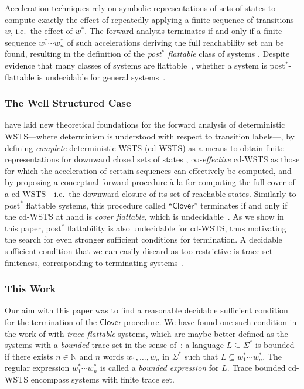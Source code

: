 \documentclass[11pt,reqno,a4paper]{amsart}
\theoremstyle{plain}
\theoremstyle{definition}
\theoremstyle{remark}
\renewcommand{\paragraph}{\subsubsection*}
\begin{document}
Acceleration techniques rely on symbolic representations of sets of
states to compute exactly the effect of repeatedly applying a finite
sequence of transitions $w$, i.e.\ the effect of $w^\ast$.  The forward
analysis terminates if and only if a finite sequence $w_1^\ast\cdots
w_n^\ast$ of such accelerations deriving the full reachability set can
be found, resulting in the definition of the \emph{post$^\ast$
  flattable} class of systems \citep{flataccel}.  Despite evidence
that many classes of systems are
flattable~\citep{flat2dim,flatevery,BFGHM-lics15},
whether a system is post$^\ast$-flattable is undecidable for general
systems~\citep{flataccel}.
 
\paragraph{The Well Structured Case}
 have laid new theoretical foundations for the
forward analysis of deterministic WSTS---where determinism is
understood with respect to transition labels---, by defining
\emph{complete} deterministic WSTS (cd-WSTS) as a means to obtain
finite representations for downward closed sets of states \citep[see
also][]{wadl}, \emph{$\infty$-effective} cd-WSTS as those for which
the acceleration of certain sequences can effectively be computed, and
by proposing a conceptual forward procedure \`a la
\citet{kmtree} for computing the full cover of a
cd-WSTS---i.e.\ the downward closure of its set of reachable states.
Similarly to post$^\ast$ flattable systems, this procedure called
``$\mathsf{Clover}$'' terminates if and only if the cd-WSTS at hand is
\emph{cover flattable}, which is undecidable~\citep{cwsts2}.  As we
show in this paper, post$^\ast$ flattability is also undecidable for
cd-WSTS, thus motivating the search for even stronger sufficient
conditions for termination.  A decidable sufficient condition that we
can easily discard as too restrictive is trace set finiteness,
corresponding to terminating systems~\citep{origwsts}.

\paragraph{This Work}
Our aim with this paper was to find a reasonable decidable sufficient
condition for the termination of the $\mathsf{Clover}$ procedure.  We
have found one such condition in the work of \citet*{foctlpr} with
\emph{trace flattable} systems, which are maybe better defined as the
systems with a \emph{bounded} trace set in the sense of~\citet{bcfl}:
a language $L\subseteq\Sigma^\ast$ is bounded if there exists
$n\in\mathbb{N}$ and $n$ words $w_1,\dots,w_n$ in $\Sigma^\ast$ such
that $L\subseteq w_1^\ast\cdots w_n^\ast$.  The regular expression
$w_1^\ast\cdots w_n^\ast$ is called a \emph{bounded expression} for
$L$.  Trace bounded cd-WSTS encompass systems with finite trace set.
\end{document}

